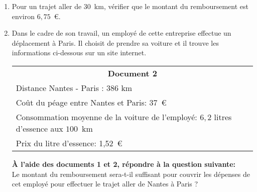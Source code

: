 \begin{enumerate}
\item Pour un \og trajet aller\fg{} de 30~km, vérifier que le montant du remboursement est environ $6,75$~\euro. \\
\item  Dans le cadre de son travail, un employé de cette entreprise effectue un déplacement à Paris. Il choisit de prendre sa voiture et il trouve les informations ci-dessous sur un site internet.

\begin{center}
\begin{tabularx}{\linewidth}{|X|}\hline
\multicolumn{1}{|c|}{\textbf{Document 2}}\\
Distance Nantes - Paris : 386 km\\
Coût du péage entre Nantes et Paris: 37~\euro\\
Consommation moyenne de la voiture de l'employé: $6,2$ litres d'essence aux $100$~km\\
Prix du litre d'essence: 1,52~\euro\\\hline
\end{tabularx}
\end{center}

\textbf{À l'aide des documents 1 et 2, répondre à la question suivante:} \\

\og Le montant du remboursement sera-t-il suffisant pour couvrir les dépenses de cet employé pour effectuer le \og trajet aller\fg{} de Nantes à Paris ? \fg
\end{enumerate}


